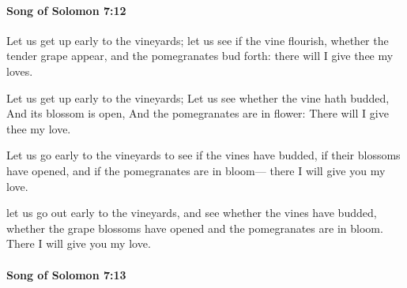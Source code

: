 		\paragraph{Song of Solomon 7:12} %
			\label{SONGOFSOLOMON-7-12}

			Let us get up early to the vineyards; let us see if the vine flourish, whether the tender grape appear, and the pomegranates bud forth: there will I give thee my loves.

			\begin{versebox}
					\item[BHS] 
					\item[LXX] 
					\item[ASV] Let us get up early to the vineyards; Let us see whether the vine hath budded, And its blossom is open, And the pomegranates are in flower: There will I give thee my love.
					\item[NIV] Let us go early to the vineyards to see if the vines have budded, if their blossoms have opened, and if the pomegranates are in bloom— there I will give you my love.
					\item[NRSV] let us go out early to the vineyards, and see whether the vines have budded, whether the grape blossoms have opened and the pomegranates are in bloom. There I will give you my love.
			\end{versebox}

		\paragraph{Song of Solomon 7:13} %
			\label{SONGOFSOLOMON-7-13}

